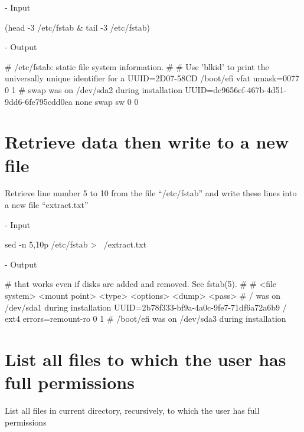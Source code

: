 \documentclass[10pt, a4paper]{article}
\begin{document}
\noindent - Input

\begin{verbbox}
(head -3 /etc/fstab & tail -3 /etc/fstab)
\end{verbbox}

\fbox{
\theverbbox
}

\pagebreak

\noindent - Output

\begin{verbbox}
# /etc/fstab: static file system information.
#
# Use 'blkid' to print the universally unique identifier for a
UUID=2D07-58CD  /boot/efi       vfat    umask=0077      0       1
# swap was on /dev/sda2 during installation
UUID=dc9656ef-467b-4d51-9dd6-6fe795cdd0ea none            swap    sw              0       0
\end{verbbox}

\fbox{
\theverbbox
}

\section{Retrieve data then write to a new file}

Retrieve line number 5 to 10 from the file “/etc/fstab” and write these lines into a new file “extract.txt”

\noindent - Input

\begin{verbbox}
sed -n 5,10p /etc/fstab > ~/extract.txt
\end{verbbox}

\fbox{
\theverbbox
}

\noindent - Output

\begin{verbbox}
# that works even if disks are added and removed. See fstab(5).
#
# <file system> <mount point>   <type>  <options>       <dump>  <pass>
# / was on /dev/sda1 during installation
UUID=2b78f333-bf9a-4a0c-9fe7-71df6a72a6b9 /               ext4    errors=remount-ro 0       1
# /boot/efi was on /dev/sda3 during installation
\end{verbbox}

\fbox{
\theverbbox
}

\section{List all files to which the user has full permissions}

List all files in current directory, recursively, to which the user has full permissions
\end{document}
